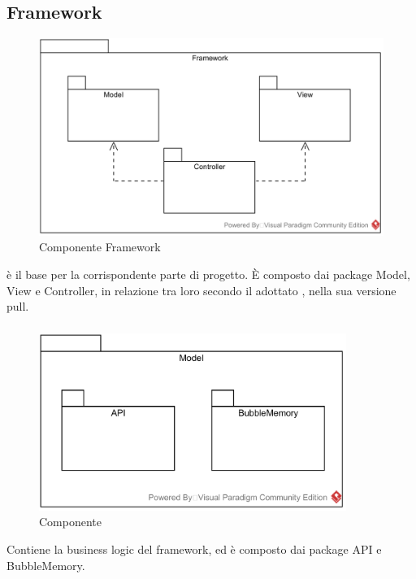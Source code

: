 \subsection{Framework} \label{framework}
\begin{figure}[H]
	\centering
	\includegraphics[width=15cm]{./diagrammi/framework.png}
	\caption{Componente Framework}
\end{figure}
 è il  base per la corrispondente parte di progetto. È composto dai package Model, View e Controller, in relazione tra loro secondo il  adottato , nella sua versione pull.

\subsubsection[::Model]{\class} \label{\class}
\begin{figure}[H]
	\centering
	\includegraphics[width=10cm]{./diagrammi/framework/model.png}
	\caption{Componente \class}
\end{figure}
Contiene la business logic del framework, ed è composto dai package API e BubbleMemory.

